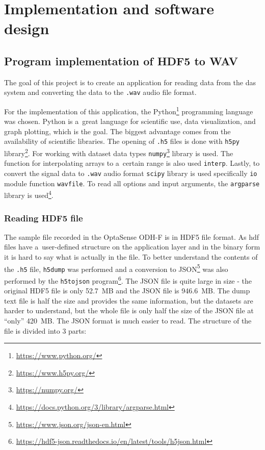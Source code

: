 \newpage %

\chapter{Implementation and software design}

\section{Program implementation of HDF5 to WAV}\label{lab:hdftowav}

The goal of this project is to create an application for reading data from the \ac{das} system and converting the data to the \verb|.wav| audio file format.

For the implementation of this application, the Python\footnote{\url{https://www.python.org/}} programming language was chosen. Python is a~great language for scientific use, data visualization, and graph plotting, which is the goal. The biggest advantage comes from the availability of scientific libraries. The opening of \verb |.h5| files is done with \verb|h5py| library\footnote{\url{https://www.h5py.org/}}. For working with dataset data types \verb|numpy|\footnote{\url{https://numpy.org/}} library is used. The function for interpolating arrays to a~certain range is also used \verb|interp|. Lastly, to convert the signal data to \verb|.wav| audio format \verb|scipy| library is used specifically \verb|io| module function \verb|wavfile|. To read all options and input arguments, the \verb|argparse| library is used\footnote{\url{https://docs.python.org/3/library/argparse.html}}.   

\subsection{Reading HDF5 file}\label{sec:readhdf}

The sample file recorded in the OptaSense ODH-F is in HDF5 file format. As \ac{hdf} files have a~user-defined structure on the application layer and in the binary form it is hard to say what is actually in the file. To better understand the contents of the \verb|.h5| file, \verb|h5dump| was performed and a conversion to JSON\footnote{\url{https://www.json.org/json-en.html}} was also performed by the \verb|h5tojson| program\footnote{\url{https://hdf5-json.readthedocs.io/en/latest/tools/h5json.html}}. The JSON file is quite large in size - the original HDF5 file is only \qty{52,7}{MB} and the JSON file is \qty{946,6}{MB}. The dump text file is half the size and provides the same information, but the datasets are harder to understand, but the whole file is only half the size of the JSON file at ``only'' \qty{420}{MB}. The JSON format is much easier to read. The structure of the file is divided into 3 parts:

